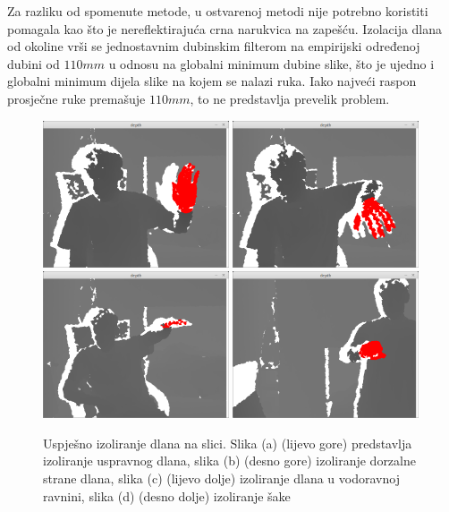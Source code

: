 \documentclass[times, utf8, diplomski, numeric]{fer}
\begin{document}
Za razliku od spomenute metode, u ostvarenoj metodi nije potrebno koristiti pomagala kao što je nereflektirajuća crna narukvica na zapešću. Izolacija dlana od okoline vrši se jednostavnim dubinskim filterom na empirijski određenoj dubini od $110mm$ u odnosu na globalni minimum dubine slike, što je ujedno i globalni minimum dijela slike na kojem se nalazi ruka. Iako najveći raspon prosječne ruke premašuje $110mm$, to ne predstavlja prevelik problem.
\begin{figure}[h!]
\centering
\includegraphics[width = 0.49\textwidth]{detekcija/izolacija-ispravno-1}
\includegraphics[width = 0.49\textwidth]{detekcija/izolacija-ispravno-2}
\includegraphics[width = 0.49\textwidth]{detekcija/izolacija-ispravno-3}
\includegraphics[width = 0.49\textwidth]{detekcija/izolacija-ispravno-4}
\caption{Uspješno izoliranje dlana na slici. 
Slika (a) (lijevo gore) predstavlja izoliranje uspravnog dlana, 
slika (b) (desno gore) izoliranje dorzalne strane dlana,
slika (c) (lijevo dolje) izoliranje dlana u vodoravnoj ravnini,
slika (d) (desno dolje) izoliranje šake} \label{successful_palm_isolation}
\end{figure}
\end{document}
